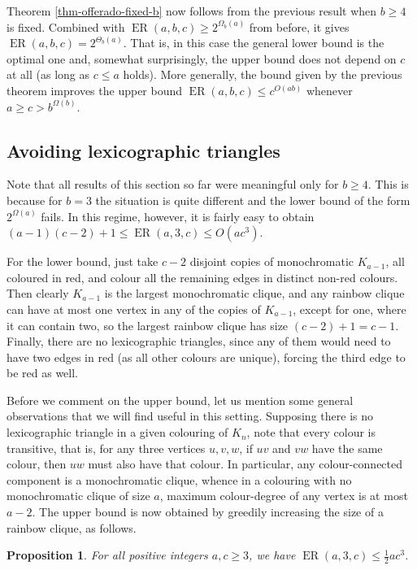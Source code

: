 \documentclass[10pt,a4paper]{article}
\theoremstyle{plain}
\newtheorem{proposition}[theorem]{Proposition}
\theoremstyle{definition}
\newcommand{\offerado}[3]{\operatorname{ER}(#1,#2,#3)}
\begin{document}
Theorem \ref{thm-offerado-fixed-b} now follows from the previous result when $b\ge 4$ is fixed. Combined with $\offerado{a}{b}{c} \ge 2^{\Omega_b(a)}$ from before, it gives $\offerado abc = 2^{\Theta_b(a)}$. That is, in this case the general lower bound is the optimal one and, somewhat surprisingly, the upper bound does not depend on $c$ at all (as long as $c\le a$ holds). More generally, the bound given by the previous theorem improves the upper bound $\offerado{a}{b}{c}\le c^{O(ab)}$ whenever $a\ge c>b^{\Omega(b)}$.

\subsection{Avoiding lexicographic triangles}\label{subsec-avoiding-lex-triang}

Note that all results of this section so far were meaningful only for $b\ge 4$. This is because for $b=3$ the situation is quite different and the lower bound of the form $2^{\Omega(a)}$ fails. In this regime, however, it is fairly easy to obtain $(a-1)(c-2)+1\le \offerado{a}{3}{c}\le O(ac^3)$.

For the lower bound, just take $c-2$ disjoint copies of monochromatic $K_{a-1}$, all coloured in red, and colour all the remaining edges in distinct non-red colours. Then clearly $K_{a-1}$ is the largest monochromatic clique, and any rainbow clique can have at most one vertex in any of the copies of $K_{a-1}$, except for one, where it can contain two, so the largest rainbow clique has size $(c-2)+1=c-1$. Finally, there are no lexicographic triangles, since any of them would need to have two edges in red (as all other colours are unique), forcing the third edge to be red as well.

Before we comment on the upper bound, let us mention some general observations that we will find useful in this setting. Supposing there is no lexicographic triangle in a given colouring of $K_n$, note that every colour is transitive, that is, for any three vertices $u,v,w$, if $uv$ and $vw$ have the same colour, then $uw$ must also have that colour. In particular, any colour-connected component is a monochromatic clique, whence in a colouring with no monochromatic clique of size $a$, maximum colour-degree of any vertex is at most $a-2$. The upper bound is now obtained by greedily increasing the size of a rainbow clique, as follows.

\begin{proposition}\label{prop-upper-b3-greedy}
    For all positive integers $a,c\ge 3$, we have $\offerado{a}{3}{c}\le\frac{1}{2}ac^3$.
\end{proposition}
\end{document}

